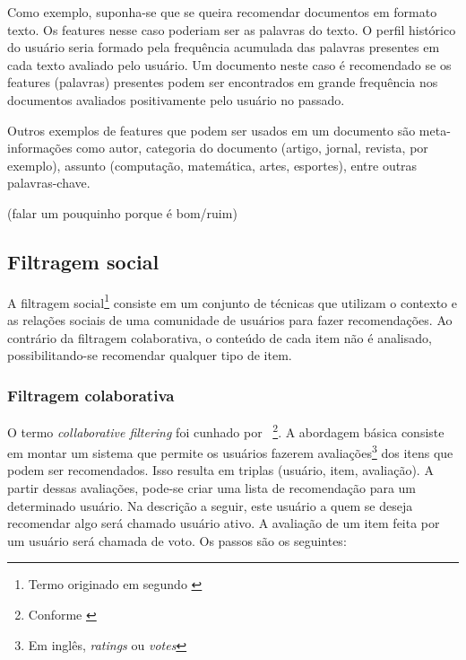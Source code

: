 Como exemplo, suponha-se que se queira recomendar documentos em formato texto. Os features nesse caso poderiam ser as palavras do texto. O perfil histórico do usuário seria formado pela frequência acumulada das palavras presentes em cada texto avaliado pelo usuário. Um documento neste caso é recomendado se os features (palavras) presentes podem ser encontrados em grande frequência nos documentos avaliados positivamente pelo usuário no passado.

Outros exemplos de features que podem ser usados em um documento são meta-informações como autor, categoria do documento (artigo, jornal, revista, por exemplo), assunto (computação, matemática, artes, esportes), entre outras palavras-chave.

(falar um pouquinho porque é bom/ruim)

\subsection{Filtragem social} %


A filtragem social\footnote{Termo originado em \cite{Malone87} segundo \cite{Hill95}} consiste em um conjunto de técnicas que utilizam o contexto e as relações sociais de uma comunidade de usuários para fazer recomendações. Ao contrário da filtragem colaborativa, o conteúdo de cada item não é analisado, possibilitando-se recomendar qualquer tipo de item.

\subsubsection{Filtragem colaborativa}

O termo \textit{collaborative filtering} foi cunhado por \cite{Goldberg92}~\footnote{Conforme \cite{Resnick97}}. A abordagem básica consiste em montar um sistema que permite os usuários fazerem avaliações\footnote{Em inglês, \textit{ratings} ou \textit{votes}} dos itens que podem ser recomendados. Isso resulta em triplas (usuário, item, avaliação). A partir dessas avaliações, pode-se criar uma lista de recomendação para um determinado usuário. Na descrição a seguir, este usuário a quem se deseja recomendar algo será chamado usuário ativo. A avaliação de um item feita por um usuário será chamada de voto. Os passos são os seguintes:

